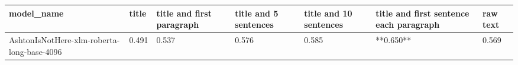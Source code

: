 \begin{tabular}{lllllll}
\toprule
                                model\_name & title & title and first paragraph & title and 5 sentences & title and 10 sentences & title and first sentence each paragraph & raw text \\
\midrule
AshtonIsNotHere-xlm-roberta-long-base-4096 & 0.491 &                     0.537 &                 0.576 &                  0.585 &                               **0.650** &    0.569 \\
\bottomrule
\end{tabular}
